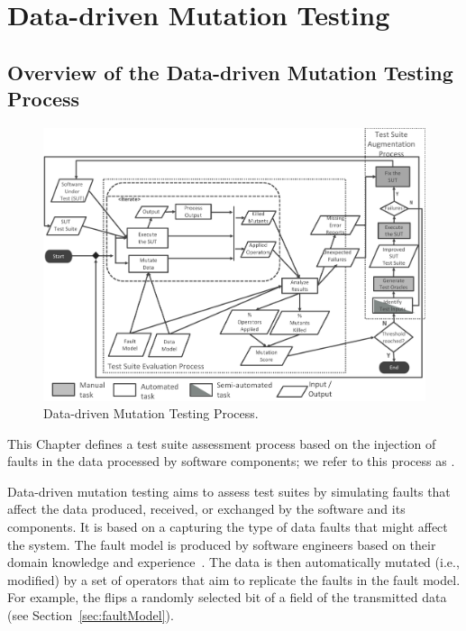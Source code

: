 
\chapter{Data-driven Mutation Testing}
\label{chapter:datamutation}


\section{Overview of the Data-driven Mutation Testing Process}
\label{sec:dataProcess}

	\begin{figure}
	\centering
		\includegraphics[width=\textwidth]{images/dataProcess}
		\caption{Data-driven Mutation Testing Process.}
		\label{fig:data:process}
	\end{figure}



This Chapter defines a test suite assessment process based on the injection of faults in the data processed by software components; we refer to this process as . 

Data-driven mutation testing aims to assess test suites by simulating faults that affect the data produced, received, or exchanged by the software and its components.
It is based on a  capturing the type of data faults that might affect the system. The fault model is produced by software engineers based on their domain knowledge and experience~\cite{di2015generating}.  The data is then automatically  mutated (i.e., modified) by a set of operators that aim to replicate the faults in the fault model. For example, the  flips a randomly selected bit of a field of the transmitted data (see Section~\ref{sec:faultModel}). 


